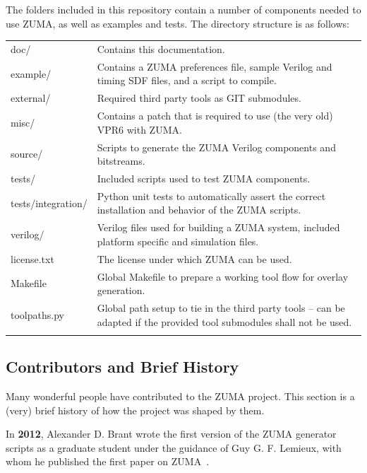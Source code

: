 \documentclass{article}
\begin{document}
\noindent The folders included in this repository contain a number of components needed to use ZUMA, as well as examples and tests.
The directory structure is as follows:\\[1.5mm]
\renewcommand{\arraystretch}{1.4}%
\begin{tabularx}{\textwidth}{lX}
    \hline
    doc/               &  Contains this documentation.  \\
    example/           &  Contains a ZUMA preferences file, sample Verilog and timing SDF files, and a script to compile.  \\
    external/          &  Required third party tools as GIT submodules. \\
    misc/              &  Contains a patch that is required to use (the very old) VPR6 with ZUMA. \\
    source/            &  Scripts to generate the ZUMA Verilog components and bitstreams. \\
    tests/             &  Included scripts used to test ZUMA components. \\
    tests/integration/ &  Python unit tests to automatically assert the correct installation and behavior of the ZUMA scripts. \\
    verilog/           &  Verilog files used for building a ZUMA system, included platform specific and simulation files. \\
    license.txt        &  The license under which ZUMA can be used. \\
    Makefile           &  Global Makefile to prepare a working tool flow for overlay generation. \\
    toolpaths.py       &  Global path setup to tie in the third party tools -- can be adapted if the provided tool submodules shall not be used. \\
    \hline \\
\end{tabularx}

\clearpage
\subsection{Contributors and Brief History}
Many wonderful people have contributed to the ZUMA project. This section is a (very) brief history of how the project was shaped by them.

In \textbf{2012}, Alexander D. Brant wrote the first version of the ZUMA generator scripts as a graduate student under the guidance of Guy G. F. Lemieux, with whom he published the first paper on ZUMA~\cite{brantlemieux2012ZUMA}.
\end{document}
